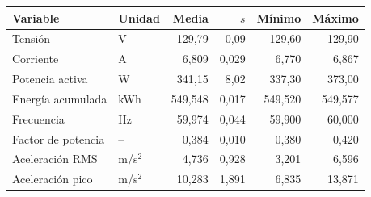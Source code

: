 \begin{tabular}{llrrrr}\toprule
Variable & Unidad & Media & $s$ & Mínimo & Máximo\\\midrule
Tensión & V & 129,79 & 0,09 & 129,60 & 129,90 \\
Corriente & A & 6,809 & 0,029 & 6,770 & 6,867 \\
Potencia activa & W & 341,15 & 8,02 & 337,30 & 373,00 \\
Energía acumulada & kWh & 549,548 & 0,017 & 549,520 & 549,577 \\
Frecuencia & Hz & 59,974 & 0,044 & 59,900 & 60,000 \\
Factor de potencia & -- & 0,384 & 0,010 & 0,380 & 0,420 \\
Aceleración RMS & m/s$^2$ & 4,736 & 0,928 & 3,201 & 6,596 \\
Aceleración pico & m/s$^2$ & 10,283 & 1,891 & 6,835 & 13,871 \\
\bottomrule\end{tabular}

